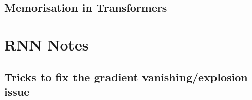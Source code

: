 \documentclass[11pt]{article}
\begin{document}
\begin{figure}[H]
    \centering
\end{figure}

\begin{figure}[H]
    \centering
\end{figure}

\subsection{Memorisation in Transformers}

\begin{figure}[H]
    \centering
\end{figure}

\clearpage

\appendix

\section{RNN Notes}

\subsection{Tricks to fix the gradient vanishing/explosion issue}\label{app:tricks-gradient-v/e}

\begin{figure}[H]
    \centering
\end{figure}
\end{document}
